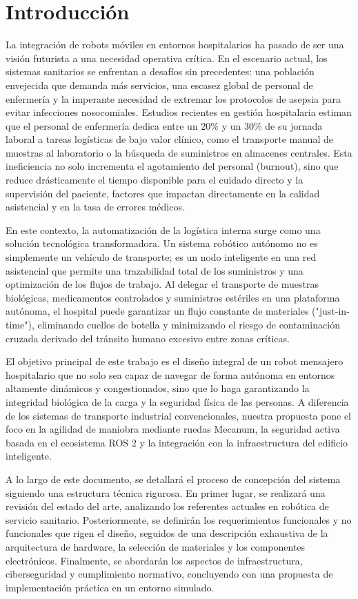 \section{Introducción}
La integración de robots móviles en entornos hospitalarios ha pasado de ser una visión futurista a una necesidad operativa crítica. En el escenario actual, los sistemas sanitarios se enfrentan a desafíos sin precedentes: una población envejecida que demanda más servicios, una escasez global de personal de enfermería y la imperante necesidad de extremar los protocolos de asepsia para evitar infecciones nosocomiales. Estudios recientes en gestión hospitalaria estiman que el personal de enfermería dedica entre un 20\% y un 30\% de su jornada laboral a tareas logísticas de bajo valor clínico, como el transporte manual de muestras al laboratorio o la búsqueda de suministros en almacenes centrales. Esta ineficiencia no solo incrementa el agotamiento del personal (burnout), sino que reduce drásticamente el tiempo disponible para el cuidado directo y la supervisión del paciente, factores que impactan directamente en la calidad asistencial y en la tasa de errores médicos.

En este contexto, la automatización de la logística interna surge como una solución tecnológica transformadora. Un sistema robótico autónomo no es simplemente un vehículo de transporte; es un nodo inteligente en una red asistencial que permite una trazabilidad total de los suministros y una optimización de los flujos de trabajo. Al delegar el transporte de muestras biológicas, medicamentos controlados y suministros estériles en una plataforma autónoma, el hospital puede garantizar un flujo constante de materiales ("just-in-time"), eliminando cuellos de botella y minimizando el riesgo de contaminación cruzada derivado del tránsito humano excesivo entre zonas críticas.

El objetivo principal de este trabajo es el diseño integral de un robot mensajero hospitalario que no solo sea capaz de navegar de forma autónoma en entornos altamente dinámicos y congestionados, sino que lo haga garantizando la integridad biológica de la carga y la seguridad física de las personas. A diferencia de los sistemas de transporte industrial convencionales, nuestra propuesta pone el foco en la agilidad de maniobra mediante ruedas Mecanum, la seguridad activa basada en el ecosistema ROS 2 y la integración con la infraestructura del edificio inteligente.

A lo largo de este documento, se detallará el proceso de concepción del sistema siguiendo una estructura técnica rigurosa. En primer lugar, se realizará una revisión del estado del arte, analizando los referentes actuales en robótica de servicio sanitario. Posteriormente, se definirán los requerimientos funcionales y no funcionales que rigen el diseño, seguidos de una descripción exhaustiva de la arquitectura de hardware, la selección de materiales y los componentes electrónicos. Finalmente, se abordarán los aspectos de infraestructura, ciberseguridad y cumplimiento normativo, concluyendo con una propuesta de implementación práctica en un entorno simulado.
